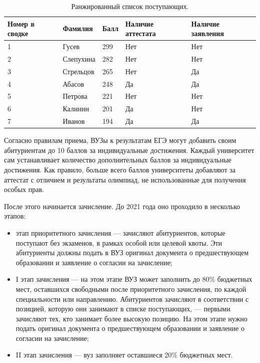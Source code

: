 \begin{table}[!hbp]
	\caption{\label{list:abitur}Ранжированный список поступающих.}
	\begin{center}
		\begin{tabular}{|l|l|l|l|l|}
			\hline
			Номер в сводке & Фамилия & Балл & Наличие аттестата & Наличие заявления \\
			\hline
			1 & Гусев & 299 & Нет &  Нет \\
			\hline
			2 & Слепухина & 282 & Нет &  Нет \\
			\hline
			3 & Стрельцов & 265 & Нет &  Да \\
			\hline
			4 & Абасов & 248 & Да &  Да \\
			\hline
			5 & Петрова & 221 & Нет &  Нет \\
			\hline
			6 & Калинин & 201 & Да &  Нет \\
			\hline
			7 & Иванов & 194 & Да &  Да \\
			\hline
		\end{tabular}
	\end{center}
\end{table}

Согласно правилам приема\cite{porydok}, ВУЗы к результатам ЕГЭ могут добавить своим абитуриентам до 10 баллов за индивидуальные достижения. Каждый университет сам устанавливает количество дополнительных баллов за индивидуальные достижения. Как правило, больше всего баллов университеты добавляют за аттестат с отличием и результаты олимпиад, не использованные для получения особых прав.

После этого начинается зачисление. До 2021 года оно проходило в несколько этапов:

\begin{itemize}[leftmargin=1.6\parindent]
	\item этап приоритетного зачисления — зачисляют абитуриентов, которые поступают без экзаменов, в рамках особой или целевой квоты\cite{celevoi}. Эти абитуриенты должны подать в ВУЗ оригинал документа о предшествующем образовании и заявление о согласии на зачисление;
	\item I этап зачисления — на этом этапе ВУЗ может заполнить до 80\% бюджетных мест, оставшихся свободными после приоритетного зачисления, по каждой специальности или направлению. Абитуриентов зачисляют в соответствии с позицией, которую они занимают в списке поступающих, — первыми зачисляют тех, кто занимает более высокую позицию. На этом этапе нужно подать оригинал документа о предшествующем образовании и заявление о согласии на зачисление;
	\item II этап зачисления — вуз заполняет оставшиеся 20\% бюджетных мест.

\end{itemize}

